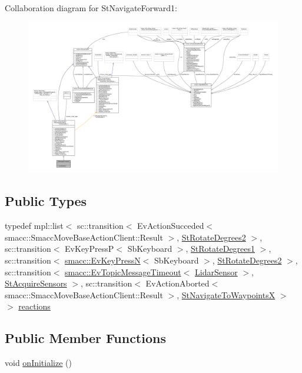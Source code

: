 Collaboration diagram for St\+Navigate\+Forward1\+:
\nopagebreak
\begin{figure}[H]
\begin{center}
\leavevmode
\includegraphics[width=350pt]{structStNavigateForward1__coll__graph}
\end{center}
\end{figure}
\subsection*{Public Types}
\begin{DoxyCompactItemize}
\item 
typedef mpl\+::list$<$ sc\+::transition$<$ Ev\+Action\+Succeded$<$ smacc\+::\+Smacc\+Move\+Base\+Action\+Client\+::\+Result $>$, \hyperlink{structStRotateDegrees2}{St\+Rotate\+Degrees2} $>$, sc\+::transition$<$ Ev\+Key\+PressP$<$ Sb\+Keyboard $>$, \hyperlink{structStRotateDegrees1}{St\+Rotate\+Degrees1} $>$, sc\+::transition$<$ \hyperlink{structsmacc_1_1EvKeyPressN}{smacc\+::\+Ev\+Key\+PressN}$<$ Sb\+Keyboard $>$, \hyperlink{structStRotateDegrees2}{St\+Rotate\+Degrees2} $>$, sc\+::transition$<$ \hyperlink{structsmacc_1_1EvTopicMessageTimeout}{smacc\+::\+Ev\+Topic\+Message\+Timeout}$<$ \hyperlink{sensor__state_8h_a9db9e1944f88de79507758d08e4a2ee3}{Lidar\+Sensor} $>$, \hyperlink{structStAcquireSensors}{St\+Acquire\+Sensors} $>$, sc\+::transition$<$ Ev\+Action\+Aborted$<$ smacc\+::\+Smacc\+Move\+Base\+Action\+Client\+::\+Result $>$, \hyperlink{structStNavigateToWaypointsX}{St\+Navigate\+To\+WaypointsX} $>$ $>$ \hyperlink{structStNavigateForward1_a9f249e99bd15cb030021ff692ea8269c}{reactions}
\end{DoxyCompactItemize}
\subsection*{Public Member Functions}
\begin{DoxyCompactItemize}
\item 
void \hyperlink{structStNavigateForward1_a49134dde57b432385db0ba37201434e0}{on\+Initialize} ()
\end{DoxyCompactItemize}
